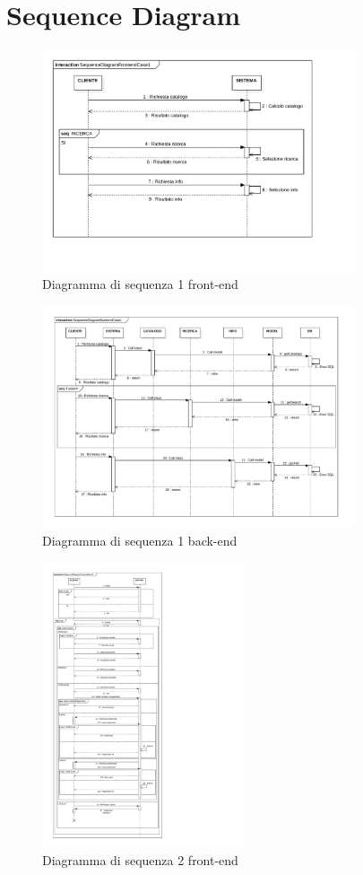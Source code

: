 \documentclass[a4paper,titlepage]{book}
\begin{document}
\section{Sequence Diagram}
\begin{figure}[H]
\center
\includegraphics[width=350px]{img/Seq1F.pdf}
\caption{Diagramma di sequenza 1 front-end \label{fig:seq1f}}
\end{figure}
\begin{figure}[H]
\center
\includegraphics[width=350px]{img/Seq1B.pdf}
\caption{Diagramma di sequenza 1 back-end \label{fig:seq1b}}
\end{figure}
\begin{figure}[H]
\center
\includegraphics[width=225px]{img/Seq2F.pdf}
\caption{Diagramma di sequenza 2 front-end \label{fig:seq2f}}
\end{figure}
\end{document}
